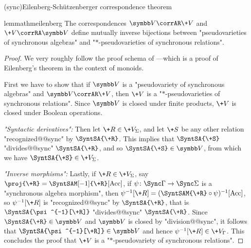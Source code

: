 \AP{}(sync){Eilenberg-Schützenberger correspondence theorem}\vspace{-1em}
\begin{restatable}{lemma}{thmeilenberg}
	\AP\label{lem:eilenberg-sy}
	The correspondences $\B{V} \corrAR \+V$ and $\+V \corrRA \B{V}$ define
	mutually inverse bijections between "pseudovarieties of
	synchronous algebras" and "$\ast$-pseudovarieties of synchronous relations".
\end{restatable}

\begin{proof}
	We very roughly follow the proof schema of \cite[\S XIII.4, pp.~226--229]{Pin2022MathematicalFoundations}---which is
	a proof of Eilenberg's theorem in the context of monoids.

	First we have to show that if $\B{V}$ is a "pseudovariety
	of synchronous algebras" and $\B{V} \corrAR \+V$, then $\+V$ is a
	"$\ast$-pseudovarieties of synchronous relations".
	Since $\B{V}$ is closed under finite products, $\+V$ is closed under Boolean operations.

	\emph{"Syntactic derivatives":} Then let $\+R \in \+V_\Sigma$, and let $\+S$ be any other relation
	"recognized@@sync" by $\SyntSA{\+R}$. This implies that $\SyntSA{\+S}$
	"divides@@sync" $\SyntSA{\+R}$, and so $\SyntSA{\+S} \in \B{V}$, from which
	we have $\SyntSA{\+S} \in \+V_\Sigma$.

	\emph{"Inverse morphisms":} Lastly, if $\+R \in \+V_\Sigma$, say $\proj{\+R} = \SyntSAM[-1]{\+R}[\Acc]$,
	if $\psi\colon \Sync\Gamma \to \Sync\Sigma$ is a "synchronous algebra morphism",
	then $\psi^{-1}[\+R] = (\SyntSAM{\+R} \circ \psi)^{-1}[\Acc]$, so
	$\psi^{-1}[\+R]$ is "recognized@@sync" by $\SyntSA{\+R}$, that is
	$\SyntSA{\psi^{-1}[\+R]}$ "divides@@sync" $\SyntSA{\+R}$. Since $\SyntSA{\+R} \in \B{V}$
	and $\B{V}$ is closed by "division@@sync", it follows that $\SyntSA{\psi^{-1}[\+R]} \in \B{V}$
	and hence $\psi^{-1}[\+R] \in \+V_{\Gamma}$. 
	This concludes the proof that $\+V$ is a "$\ast$-pseudovariety of synchronous relations".


\end{proof}
